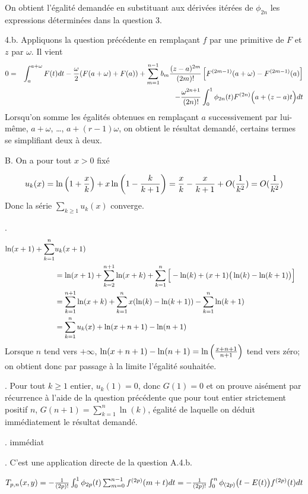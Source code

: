 {\begin{enumerate}
{On obtient l'égalité demandée en substituant aux  dérivées itérées
de $\phi_{2n}$ les expressions déterminées dans la question 3.      

\medskip
4.b. Appliquons la question précédente en remplaçant $f$ par une
primitive de $F$ et $z$ par $\omega$. Il vient
\begin{eqnarray*}
0 &=& \int_a^{a+\omega} F(t)dt - {\omega\over2} (F(a+\omega)+F(a)) 
+ \sum_{m=1}^{n-1} b_m {(z-a)^{2m} \over (2m)!} \left[ F^{(2m-1)}(a+\omega) - F^{(2m-1)}(a) \right] 
\\
&& - {\omega^{2n+1}\over (2n)!} \int_0^1 \phi_{2n}(t)F^{(2n)}\Big( a+(z-a)t \Big)dt  
 \end{eqnarray*}
Lorsqu'on somme les égalités obtenues en remplaçant $a$ successivement
par lui-m{\^e}me, $a+\omega$, \dots, $a+(r-1)\omega$, on obtient le résultat demandé,
certains termes se simplifiant deux à deux.

\bigskip
{\leftskip=-1cm B. On a pour tout $x>0$ fixé \par}
$$u_k(x)=\ln \left( 1+{x\over k} \right)
                        + x \ln \left( 1-{k\over k+1} \right)
                        ={x\over k}-{x\over k+1}+O({1\over k^2})
                        =O({1\over k^2})$$
Donc la série $\sum_{k\geq1}u_k(x)$ converge.

. 
$$\begin{aligned}
\ln(x+1)+\sum_{k=1}^n &u_k(x+1)  \cr
        &=\ln(x+1) + \sum_{k=2}^{n+1} \ln(x+k)
                        + \sum_{k=1}^n \Big[ -\ln(k)
                                + (x+1) \big(\ln(k)-\ln(k+1)\big) \Big] \cr
        &=\sum_{k=1}^{n+1} \ln(x+k)                                
                        + \sum_{k=1}^n  x (\ln(k)-\ln(k+1)) 
                        - \sum_{k=1}^n \ln(k+1)        \cr
        &=\sum_{k=1}^n u_k(x) + \ln(x+n+1) - \ln(n+1)  \cr
\end{aligned}
$$
Lorsque $n$ tend vers $+\infty$,
$\ln(x+n+1) - \ln(n+1)=\ln \left( {x+n+1 \over n+1} \right)$ tend vers zéro;
on obtient donc par passage à la limite l'égalité souhaitée.

. Pour tout $k\geq1$ entier, $u_k(1)=0$, donc $G(1)=0$ et
on prouve aisément par récurrence à l'aide de la question précédente
que pour tout entier strictement positif $n$, $G(n+1)=\sum_{k=1}^n \ln(k)$,
égalité de laquelle on déduit immédiatement le résultat demandé.

. immédiat

. C'est une application directe de la question A.4.b.\par
$T_{p,n}(x,y)=-{1\over(2p)!}\int_0^1 \phi_{2p}(t)
                        \sum_{m=0}^{n-1} f^{(2p)}(m+t) dt
=-{1\over(2p)!} \int_0^n \phi_{(2p)} \big( t-E(t) \big) f^{(2p)}(t)dt$


}
\end{enumerate}}
